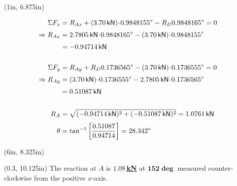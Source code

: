 \documentclass[10pt,oneside]{article}
\begin{document}
\begin{textblock*}{0.7\textwidth}(1in, 6.875in)

  \begin{align*}
    \Sigma F_x &= R_{Ax}+(3.70\,\mathsf{kN})\cd\cos 55\deg-R_D\cos 65\deg = 0 \\[0.25em]
    \Ra R_{Ax} &= 2.7805\,\mathsf{kN}\cd\cos 65\deg-(3.70\,\mathsf{kN})\cd\cos 55\deg \\[0.25em]
    &= -0.94714\,\mathsf{kN} \\\\
    \Sigma F_y &= R_{Ay}+R_D\sin 65\deg-  (3.70\,\mathsf{kN})\cd\sin 55\deg = 0 \\[0.25em]
    \Ra R_{Ay} &= (3.70\,\mathsf{kN})\cd\sin 55\deg -2.7805\,\mathsf{kN}\cd\sin 65\deg\\[0.25em]
    &= 0.51087\,\mathsf{kN} \\\\
    R_A &= \sqrt{(-0.94714\,\mathsf{kN})^2+(-0.51087\,\mathsf{kN})^2} = 1.0761\,\mathsf{kN} \\[0.25em]
    \theta & = \tan^{-1}\left[\frac{0.51087}{0.94714}\right] = 28.342\deg       \\
  \end{align*}

  
\end{textblock*}

\begin{textblock*}{0.25\textwidth}(6in, 8.325in)
\end{textblock*}

\begin{textblock*}{0.8\textwidth}(0.3\textwidth, 10.125in)
  \large\centering
  The reaction at $A$ is \underline{$\bm{1.08\,}${\bf kN}} at \underline{$\bm{152\deg}$} measured counter-clockwise from the positive $x$-axis.
\end{textblock*}

\end{document}
